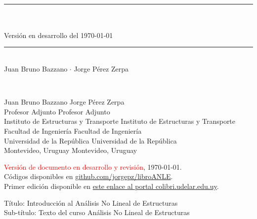 \documentclass[spanish,twoside,openright,10pt]{book}
\begin{document}
\frontmatter

\begin{titlepage}

~
\vspace{2cm}

\doublespacing
  \noindent
\textcolor{miblue}{        \rule{\linewidth}{0.4mm}} \\[0.2cm]
  \\[0.3cm]
                {\large\sffamily Versión en desarrollo del \today}\\
\textcolor{miblue}{\rule{\linewidth}{.4mm}} \\[0.2cm]
{\large\sffamily  Juan Bruno Bazzano  $\cdot$ Jorge Pérez Zerpa}

\end{titlepage}

~
\vspace{5mm}
\singlespacing

  \noindent
{\sffamily Juan Bruno Bazzano \hfill Jorge Pérez Zerpa\\
	{\footnotesize 	Profesor Adjunto \hfill Profesor Adjunto\\
		Instituto de Estructuras y Transporte  \hfill Instituto de Estructuras y Transporte\\
		Facultad de Ingeniería \hfill Facultad de Ingeniería\\
		Universidad de la República \hfill Universidad de la República\\
		Montevideo, Uruguay \hfill Montevideo, Uruguay}}\\[0.5cm]

\vspace{20mm}

\noindent
\textcolor{red}{
Versión de documento en desarrollo y revisión}, \today.\\
Códigos disponibles en \href{https://github.com/jorgepz/libroANLE}{github.com/jorgepz/libroANLE}.\\[1cm]

\noindent
Primer edición disponible en 
\href{https://www.colibri.udelar.edu.uy/jspui/bitstream/20.500.12008/22106/1/Bazzano_P%c3%a9rezZerpa_Introducci%c3%b3n_al_An%c3%a1lisis_No_Lineal_de_Estructuras_2017.pdf}{este enlace al portal colibri.udelar.edu.uy}.

\noindent
Título: Introducción al Análisis No Lineal de Estructuras\\
\noindent
Sub-título: Texto del curso Análisis No Lineal de Estructuras\\[-2mm]
\end{document}
